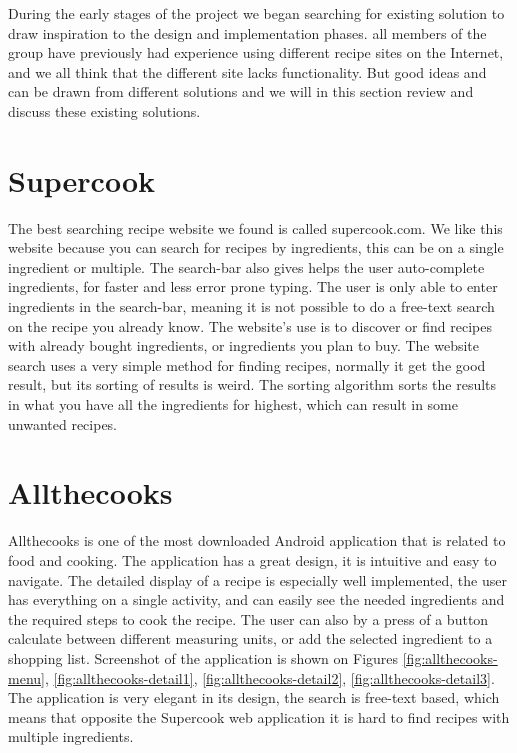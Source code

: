During the early stages of the project we began searching for existing solution to draw inspiration to the design and implementation phases. all members of the group have previously had experience using different recipe sites on the Internet, and we all think that the different site lacks functionality. But good ideas and can be drawn from different solutions and we will in this section review and discuss these existing solutions.  

\section{Supercook}
The best searching recipe website we found is called supercook.com\cite{supercook}. We like this website because you can search for recipes by ingredients, this can be on a single ingredient or multiple. The search-bar also gives helps the user auto-complete ingredients, for faster and less error prone typing. 
The user is only able to enter ingredients in the search-bar, meaning it is not possible to do a free-text search on the recipe you already know. The website's use is to discover or find recipes with already bought ingredients, or ingredients you plan to buy. 
The website search uses a very simple method for finding recipes, normally it get the good result, but its sorting of results is weird. The sorting algorithm sorts the results in what you have all the ingredients for highest, which can result in some unwanted recipes. 

\section{Allthecooks}
Allthecooks is one of the most downloaded \cite{allthecooks-googleplay} Android application that is related to food and cooking. The application has a great design, it is intuitive and easy to navigate. The detailed display of a recipe is especially well implemented, the user has everything on a single activity, and can easily see the needed ingredients and the required steps to cook the recipe. The user can also by a press of a button calculate between different measuring units, or add the selected ingredient to a shopping list. Screenshot of the application is shown on Figures \ref{fig:allthecooks-menu}, \ref{fig:allthecooks-detail1}, \ref{fig:allthecooks-detail2}, \ref{fig:allthecooks-detail3}. The application is very elegant in its design, the search is free-text based, which means that opposite the Supercook web application it is hard to find recipes with multiple ingredients.

